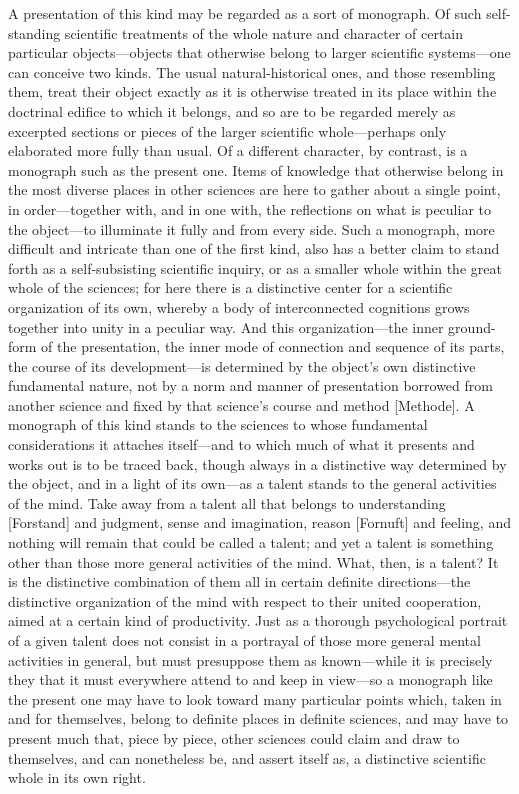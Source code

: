 \documentclass[12pt,a4paper]{book}
\begin{document}
A presentation of this kind may be regarded as a sort of monograph. Of such
self-standing scientific treatments of the whole nature and character of
certain particular objects---objects that otherwise belong to larger scientific
systems---one can conceive two kinds. The usual natural-historical ones, and
those resembling them, treat their object exactly as it is otherwise treated in
its place within the doctrinal edifice to which it belongs, and so are to be
regarded merely as excerpted sections or pieces of the larger scientific
whole---perhaps only elaborated more fully than usual. Of a different character,
by contrast, is a monograph such as the present one. Items of knowledge that
otherwise belong in the most diverse places in other sciences are here to
gather about a single point, in order---together with, and in one with, the
reflections on what is peculiar to the object---to illuminate it fully and from
every side. Such a monograph, more difficult and intricate than one of the
first kind, also has a better claim to stand forth as a self-subsisting
scientific inquiry, or as a smaller whole within the great whole of the
sciences; for here there is a distinctive center for a scientific organization
of its own, whereby a body of interconnected cognitions grows together into
unity in a peculiar way. And this organization---the inner ground-form of the
presentation, the inner mode of connection and sequence of its parts, the
course of its development---is determined by the object's own distinctive
fundamental nature, not by a norm and manner of presentation borrowed from
another science and fixed by that science's course and method [Methode]. A
monograph of this kind stands to the sciences to whose fundamental
considerations it attaches itself---and to which much of what it presents and
works out is to be traced back, though always in a distinctive way determined
by the object, and in a light of its own---as a talent stands to the general
activities of the mind. Take away from a talent all that belongs to
understanding [Forstand] and judgment, sense and imagination, reason [Fornuft]
and feeling, and nothing will remain that could be called a talent; and yet a
talent is something other than those more general activities of the mind. What,
then, is a talent? It is the distinctive combination of them all in certain
definite directions---the distinctive organization of the mind with respect to
their united cooperation, aimed at a certain kind of productivity. Just as a
thorough psychological portrait of a given talent does not consist in a
portrayal of those more general mental activities in general, but must
presuppose them as known---while it is precisely they that it must everywhere
attend to and keep in view---so a monograph like the present one may have to
look toward many particular points which, taken in and for themselves, belong
to definite places in definite sciences, and may have to present much that,
piece by piece, other sciences could claim and draw to themselves, and can
nonetheless be, and assert itself as, a distinctive scientific whole in its own
right.
\end{document}
